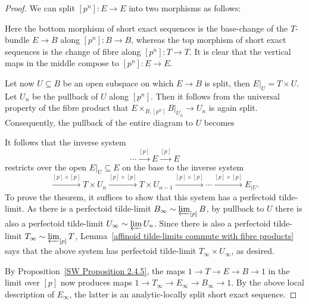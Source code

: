 \documentclass[10pt,oneside]{amsart}
\theoremstyle{definition}
\newcommand{\id}{{\operatorname{id}}}
\begin{document}
	\begin{proof}
	We can split $[p^n]:E\to E$ into two morphisms as follows:
			\begin{center}
				\end{center}
			Here the bottom morphism of short exact sequences is the base-change of the $T$-bundle $E\to B$ along $[p^n]:B\to B$, whereas the top morphism of short exact sequences is the change of fibre along $[p^n]:T\to T$. It is clear that the vertical maps in the middle compose to $[p^n]:E\to E$.
			
			Let now $U\subseteq B$ be an open subspace on which $E\to B$ is split, then $E|_U=T\times U$. Let $U_n$ be the pullback of $U$ along $[p^n]$. Then it follows from the universal property of the fibre product that $E\times_{B,[p^n]}B|_{U_n}\to U_n$ is again split. Consequently, the pullback of the entire diagram to $U$ becomes
					\begin{center}
						\end{center}
				It follows that the inverse system \[\cdots \xrightarrow{[p]}E\xrightarrow{[p]}E\]
			 	restricts over the open $E|_U\subseteq E$ on the base to the inverse system
				\[\xrightarrow{[p]\times [p]}T\times U_n\xrightarrow{[p]\times [p]}T\times U_{n-1}\xrightarrow{[p]\times [p]}\cdots \xrightarrow{[p]\times [p]}E_{|U}. \]
				To prove the theorem, it suffices to show that this system has a perfectoid tilde-limit.
				As there is a perfectoid tilde-limit $B_\infty\sim \varprojlim_{[p]} B$, by pullback to $U$ there is also a perfectoid tilde-limit $U_\infty\sim \varprojlim U_n$. Since there is also a perfectoid tilde-limit $T_\infty\sim \varprojlim_{[p]} T$,  Lemma~\ref{affinoid tilde-limits commute with fibre products} says that the above system has perfectoid tilde-limit $T_\infty\times U_\infty$, as desired.
				
				By Proposition~\ref{SW Proposition 2.4.5}, the maps $1\to T\to E\to B\to 1$ in the limit over $[p]$ now produces maps $1\to T_\infty \to E_\infty\to B_\infty\to 1$. By the above local description of $E_\infty$, the latter is an analytic-locally split short exact sequence.
	\end{proof}
	
\end{document}
